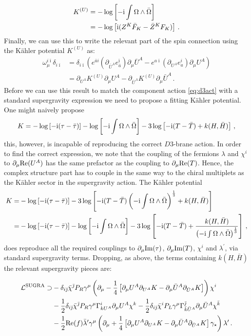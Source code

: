\documentclass[a4paper,12pt]{report}
\newcommand{\be}{\begin{equation}}
\newcommand{\ee}{\end{equation}}
\newcommand{\bea}{\begin{equation}\begin{aligned}}
\newcommand{\eea}{\end{aligned}\end{equation}}
\def\rmi{{\rm i}}
\def\ib{{\bar \imath}}
\def\jb{{\bar \jmath}}
\def\rmre{{\rm Re}}
\def\rmim{{\rm Im}}
\begin{document}
\bea 
K^{(U)} &= - \log \left[ -\rmi \int \Omega \wedge \bar{\Omega} \right] \\
&= - \log \left[ \rmi (Z^K \bar{F}_K - \bar{Z}^K F_K ) \right] \,.
\eea
Finally, we can use this to write the relevant part of the spin connection using the Kähler potential $K^{(U)}$ as:
\bea 
\omega_\mu^{i\ib} \delta_{i\ib} &= \delta_{i\ib} \left( e^{\bar{a}i} (\partial_{\bar{U}^A} e^{\ib}_{\bar{a}}) \partial_\mu \bar{U}^A - e^{a\ib} (\partial_{U^A} e^i_a )\partial_\mu U^A\right)\\
&= \partial_{U^A} K^{(U)} \partial_\mu U^A - \partial_{\bar{U}^A} K^{(U)} \partial_\mu \bar{U}^A\,.
\eea
Before we can use this result to match the component action \eqref{eq:d3act} with a standard supergravity expression we need to propose a fitting Kähler potential. One might naively propose 
\be
K = - \log\left[-\rmi (\tau-\bar{\tau})\right] - \log\left[-\rmi \int \Omega \wedge \bar{\Omega}\right] - 3 \log \left[-\rmi(T-\bar{T})  + k(H,\bar{H})\right]\,,
\ee
this, however, is incapable of reproducing the correct $D3$-brane action. In order to find the correct expression, we note that the coupling of the fermions $\lambda$ and $\chi^i$ to $\partial_\mu \rmre(U^A)$ has the same prefactor as the coupling to $\partial_\mu \rmre(T)$. Hence, the complex structure part has to couple in the same way to the chiral multiplets as the Kähler sector in the supergravity action. The Kähler potential
\bea 
K =& - \log\left[-\rmi (\tau-\bar{\tau})\right] - 3 \log \left[-\rmi(T-\bar{T}) \left(-\rmi\int \Omega \wedge \bar{\Omega}\right)^{\frac{1}{3}} + k(H,\bar{H})\right]\\
=&  - \log\left[-\rmi (\tau-\bar{\tau})\right] - \log\left[-\rmi \int \Omega \wedge \bar{\Omega}\right] - 3 \log \left[-\rmi(T-\bar{T})  + \frac{k(H,\bar{H})}{\left(-\rmi\int \Omega \wedge \bar{\Omega}\right)^{\frac{1}{3}}}\right]\,,
\label{eq:deKpot}
\eea
does reproduce all the required couplings to $\partial_{\mu} \rmim(\tau)$, $\partial_\mu \rmim(T)$, $\chi^i$ and $\lambda^\prime$, via standard supergravity terms. Dropping, as above, the terms containing $k(H,\bar{H})$ the relevant supergravity pieces are:

\bea 
\mathcal{L}^{\text{SUGRA}} \supset &-\delta_{i\jb} \bar{\chi}^\jb P_R \gamma^\mu \left( \partial_\mu - \frac{1}{4} \left[\partial_\mu U^A \partial_{U^A} K - \partial_\mu \bar{U}^A \partial_{\bar{U}^A} K \right]\right)\chi^i\\
&- \frac{1}{2} \delta_{i\jb} \bar{\chi}^\jb P_R \gamma^\mu \Gamma^i_{kU^A} \partial_\mu U^A \chi^k-\frac{1}{2} \delta_{i\jb} \bar{\chi}^i P_L \gamma^\mu \Gamma^\jb_{\bar{k}\bar{U}^A} \partial_\mu \bar{U}^A \chi^{\bar{k}}\\
&-\frac{1}{2} \rmre(f)\bar{\lambda}^\prime \gamma^\mu \left( \partial_\mu + \frac{1}{4} \left[\partial_\mu U^A \partial_{U^A} K - \partial_\mu \bar{U}^A \partial_{\bar{U}^A} K\right]\gamma_\star\right)\lambda^\prime\,.
\eea
\end{document}
